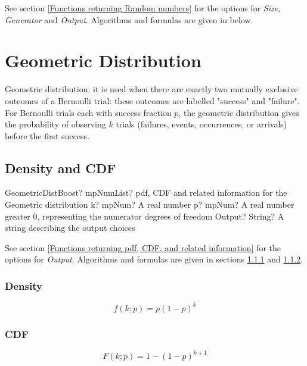 \vspace{0.3cm}

See section \ref{Functions returning Random numbers} for the options for  {\itshape\sffamily Size},  {\itshape\sffamily Generator} and {\itshape\sffamily Output}. Algorithms and formulas are given in below.



\newpage
\section{Geometric Distribution}

Geometric distribution: it is used when there are exactly two mutually exclusive outcomes of a Bernoulli trial: these outcomes are labelled "success" and "failure". For Bernoulli trials each with success fraction $p$, the geometric distribution gives the probability of observing $k$ trials (failures, events,
occurrences, or arrivals) before the first success.




\subsection{Density and CDF}

\begin{mpFunctionsExtract}
	\mpFunctionThreeNotImplemented
	{GeometricDistBoost? mpNumList? pdf, CDF and related information for the Geometric distribution}
	{k? mpNum? A real number}
	{p? mpNum? A real number greater 0, representing the numerator  degrees of freedom}
	{Output? String? A string describing the output choices}
\end{mpFunctionsExtract}


\vspace{0.3cm}
See section \ref{Functions returning pdf, CDF, and related information} for the options for {\itshape\sffamily Output}. Algorithms and formulas are given in sections \ref{GeometricDistributionDensity} and \ref{GeometricDistributionCDF}.


\subsubsection{Density}
\label{GeometricDistributionDensity}

\begin{equation} 
	f(k;p)= p (1-p)^k 
\end{equation}


\subsubsection{CDF}
\label{GeometricDistributionCDF}
\begin{equation} 
	F(k;p)= 1- (1-p)^{k+1} 
\end{equation}

